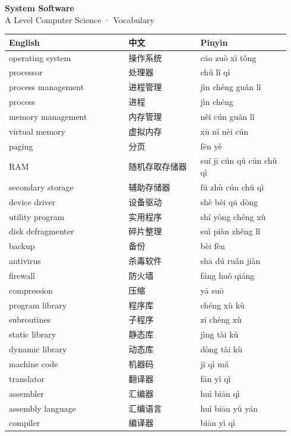 \documentclass[11pt]{article}
\begin{document}
\begin{center}
  {\LARGE\bfseries System Software}\\[0.35em]
  {\large A Level Computer Science · Vocabulary}
\end{center}
\vspace{0.6em}

\begin{longtable}{@{}p{0.40\linewidth}p{0.24\linewidth}p{0.30\linewidth}@{}}
\toprule
\textbf{English} & \textbf{中文} & \textbf{Pinyin} \\
\midrule
\endhead
\bottomrule
\endlastfoot
operating system & 操作系统 & cāo zuò xì tǒng \\
processor & 处理器 & chǔ lǐ qì \\
process management & 进程管理 & jìn chéng guǎn lǐ \\
process & 进程 & jìn chéng \\
memory management & 内存管理 & nèi cún guǎn lǐ \\
virtual memory & 虚拟内存 & xū nǐ nèi cún \\
paging & 分页 & fēn yè \\
RAM & 随机存取存储器 & suí jī cún qǔ cún chǔ qì \\
secondary storage & 辅助存储器 & fǔ zhù cún chǔ qì \\
device driver & 设备驱动 & shè bèi qū dòng \\
utility program & 实用程序 & shí yòng chéng xù \\
disk defragmenter & 碎片整理 & suì piàn zhěng lǐ \\
backup & 备份 & bèi fèn \\
antivirus & 杀毒软件 & shā dú ruǎn jiàn \\
firewall & 防火墙 & fáng huǒ qiáng \\
compression & 压缩 & yā suō \\
program library & 程序库 & chéng xù kù \\
subroutines & 子程序 & zi chéng xù \\
static library & 静态库 & jìng tài kù \\
dynamic library & 动态库 & dòng tài kù \\
machine code & 机器码 & jī qì mǎ \\
translator & 翻译器 & fān yì qì \\
assembler & 汇编器 & huì biān qì \\
assembly language & 汇编语言 & huì biān yǔ yán \\
compiler & 编译器 & biān yì qì \\

\end{longtable}
\end{document}
